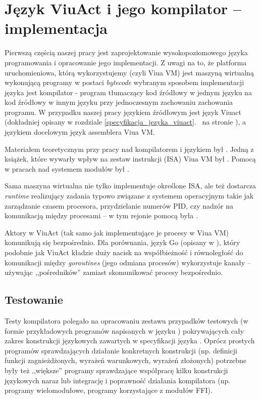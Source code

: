 \chapter{Język ViuAct i jego kompilator -- implementacja}
\label{viuact_impl}
\label{jezyk_viuact_i_jego_kompilator}

Pierwszą częścią naszej pracy jest zaprojektowanie wysokopoziomowego języka programowania i opracowanie jego
implementacji. Z uwagi na to, że platforma uruchomieniowa, którą wykorzystujemy (czyli Viua VM) jest maszyną
wirtualną wykonującą programy w postaci \emph{bytecode} wybranym sposobem implementacji języka jest
kompilator - program tłumaczący kod źródłowy w jednym języku na kod źródłowy w innym języku przy jednoczesnym
zachowaniu zachowania programu. W przypadku naszej pracy językiem źródłowym jest język Viuact (dokładniej
opisany w rozdziale \ref{specyfikacja_jezyka_viuact}.~ na stronie
\pageref{specyfikacja_jezyka_viuact}), a językiem docelowym język assemblera Viua VM.

Materiałem teoretycznym przy pracy nad kompilatorem i językiem był \cite{ProgrammingLanguagePragmatics}.
Jedną z książek, które wywarły wpływ na zestaw instrukcji (ISA) Viua VM był \cite{RISCV}.
Pomocą w pracach nad systemem modułów był \cite{Linkers}.

Sama maszyna wirtualna nie tylko implementuje określone ISA, ale też dostarcza \emph{runtime} realizujący
zadania typowo związane z systemem operacyjnym takie jak zarządzanie czasem procesora, przydzielanie numerów
PID, czy nadzór na komunikacją między procesami -- w tym rejonie pomocą była \cite{OperatingSystems}.

Aktory w ViuAct (tak samo jak implementujące je procesy w Viua VM) komunikują się bezpośrednio.
Dla porównania, język Go (opisany w \cite{Golang}), który podobnie jak ViuAct kładzie duży nacisk na
współbieżność i równoległość do komunikacji między \emph{goroutines} (jego odmiana procesów) wykorzystuje
kanały -- używając ,,pośredników'' zamiast skomunikować procesy bezpośrednio.





\section{Testowanie}

Testy kompilatora polegało na opracowaniu zestawu przypadków testowych (w formie
przykładowych programów napisanych w języku \ViuAct) pokrywających cały zakres
konstrukcji językowych zawartych w specyfikacji języka \ViuAct. Oprócz prostych
programów sprawdzających działanie konkretnych konstrukcji (np. definicji
funkcji zagnieżdżonych, wyrażeń warunkowych, wyrażeń złożonych) potrzebne były
też ,,większe'' programy sprawdzające współpracę kilku konstrukcji językowych
naraz lub integrację i poprawność działania kompilatora (np. programy
wielomodułowe, programy korzystające z modułów FFI).

